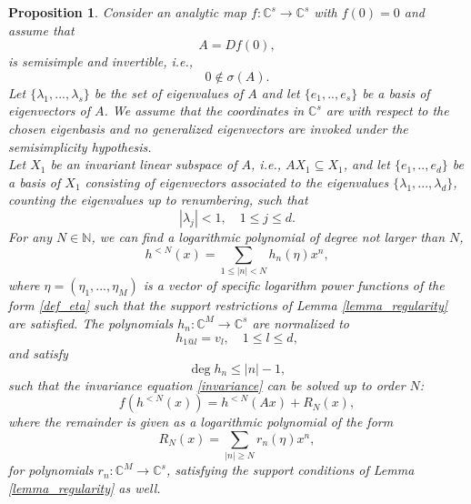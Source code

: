 \documentclass{amsart}
\theoremstyle{plain}
\newtheorem{proposition}[theorem]{Proposition}
\theoremstyle{definition}
\begin{document}
\begin{proposition}\label{approx}
\quad 
Consider an analytic map $f:\mathbb{C}^s\to\mathbb{C}^s$ with $f(0)=0$ and assume that
 \begin{equation}
A=Df(0),
\end{equation}
is semisimple and invertible, i.e.,
\begin{equation}\label{zeronotinspectrum}
0\notin \sigma(A).
\end{equation}
Let $\{\lambda_1,...,\lambda_s\}$ be the set of eigenvalues of $A$ and let $\{e_1,..,e_s\}$ be a basis of eigenvectors of $A$. We assume that the coordinates in $\mathbb{C}^s$ are with respect to the chosen eigenbasis and no generalized eigenvectors are
invoked under the semisimplicity hypothesis.\\
Let $X_1$ be an invariant linear subspace of $A$, i.e., $AX_1\subseteq X_1$, and let $\{e_1,..,e_d\}$ be a basis of $X_1$ consisting of eigenvectors associated to the eigenvalues $\{\lambda_1,...,\lambda_d\}$, counting the eigenvalues up to renumbering, such that
\begin{equation}\label{lambdanotone}
|\lambda_j|< 1,\quad 1\leq j\leq d.
\end{equation} 
For any $N\in\mathbb{N}$, we can find a logarithmic polynomial of degree not larger than $N$,
\begin{equation}\label{hN}
h^{< N}(x)=\sum_{1\leq |n|< N} h_n(\eta)x^n,
\end{equation}
where $\eta = (\eta_1,...,\eta_M)$ is a vector of specific logarithm power functions of the form \eqref{def_eta} such that the support restrictions of Lemma \ref{lemma_regularity} are satisfied. The polynomials $h_n:\mathbb{C}^M\to\mathbb{C}^s$ are
normalized to
\begin{equation}\label{pO1}
h_{1@l}=v_l, \quad 1\leq l\leq d,
\end{equation}
and satisfy 
\begin{equation}\label{bounddegree}
    \deg h_n \leq |n|-1,
\end{equation}
such that the invariance equation \eqref{invariance} can be solved up to order $N$:
\begin{equation}
f(h^{< N}(x))=h^{< N}(Ax)+R_N(x),
\end{equation}
where the remainder is given as a logarithmic polynomial of the form
\begin{equation}
R_N(x)=\sum_{|n|\geq N}r_n(\eta)x^n, %
\end{equation}
for polynomials $r_n:\mathbb{C}^M\to\mathbb{C}^s$, satisfying the support conditions of Lemma \ref{lemma_regularity} as well. 
\end{proposition}
\end{document}
